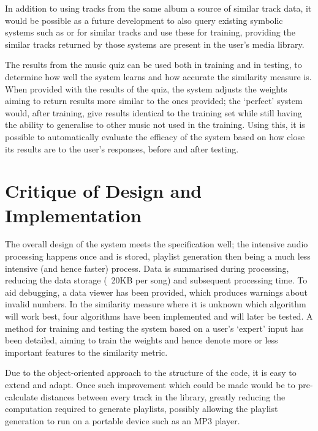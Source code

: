 In addition to using tracks from the same album a source of similar track data, it would be possible as a future development to also query existing symbolic systems such as  or  for similar tracks and use these for training, providing the similar tracks returned by those systems are present in the user's media library.

The results from the music quiz can be used both in training and in testing, to determine how well the system learns and how accurate the similarity measure is. When provided with the results of the quiz, the system adjusts the weights aiming to return results more similar to the ones provided; the `perfect' system would, after training, give results identical to the training set while still having the ability to generalise to other music not used in the training. Using this, it is possible to automatically evaluate the efficacy of the system based on how close its results are to the user's responses, before and after testing.
\section{Critique of Design and Implementation}
The overall design of the system meets the specification well; the intensive audio processing happens once and is stored, playlist generation then being a much less intensive (and hence faster) process. Data is summarised during processing, reducing the data storage (~20KB per song) and subsequent processing time. To aid debugging, a data viewer has been provided, which produces warnings about invalid numbers. In the similarity measure where it is unknown which algorithm will work best, four algorithms have been implemented and will later be tested. A method for training and testing the system based on a user's `expert' input has been detailed, aiming to train the weights and hence denote more or less important features to the similarity metric.

Due to the object-oriented approach to the structure of the code, it is easy to extend and adapt. Once such improvement which could be made would be to pre-calculate distances between every track in the library, greatly reducing the computation required to generate playlists, possibly allowing the playlist generation to run on a portable device such as an MP3 player.
